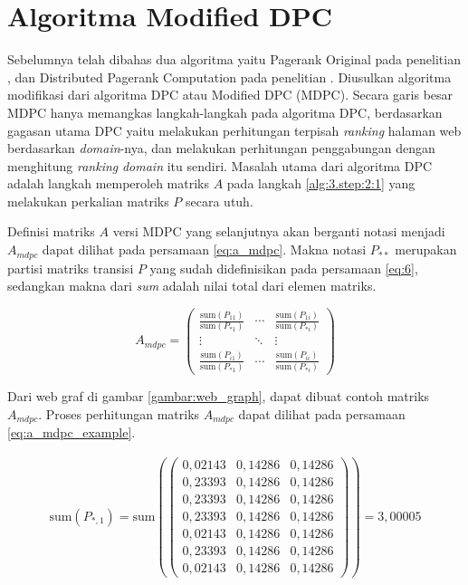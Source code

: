 \section{Algoritma Modified DPC}

Sebelumnya telah dibahas dua algoritma yaitu Pagerank Original pada penelitian \citet{ilprints422}, dan Distributed Pagerank Computation pada penelitian \citet{zhuetal2005distributedPagerank}. Diusulkan algoritma modifikasi dari algoritma DPC atau Modified DPC (MDPC). Secara garis besar MDPC hanya memangkas langkah-langkah pada algoritma DPC, berdasarkan gagasan utama DPC yaitu melakukan perhitungan terpisah \textit{ranking} halaman web berdasarkan \textit{domain}-nya, dan melakukan perhitungan penggabungan dengan menghitung \textit{ranking} \textit{domain} itu sendiri. Masalah utama dari algoritma DPC adalah langkah memperoleh matriks $A$ pada langkah \ref{alg:3.step:2:1} yang melakukan perkalian matriks $P$ secara utuh.

Definisi matriks $A$ versi MDPC yang selanjutnya akan berganti notasi menjadi $A_{mdpc}$ dapat dilihat pada persamaan \ref{eq:a_mdpc}. Makna notasi $P_{**}$ merupakan partisi matriks transisi $P$ yang sudah didefinisikan pada persamaan \ref{eq:6}, sedangkan makna dari \textit{sum} adalah nilai total dari elemen matriks.

\begin{equation}
	\label{eq:a_mdpc}
	A_{mdpc} =
	\begin{pmatrix}
		\frac{\text{sum}(P_{11})}{\text{sum}(P_{*1})} & \cdots & \frac{\text{sum}(P_{1i})}{\text{sum}(P_{*i})} \\
		\vdots & \ddots & \vdots \\
		\frac{\text{sum}(P_{i1})}{\text{sum}(P_{*1})} & \cdots & \frac{\text{sum}(P_{ii})}{\text{sum}(P_{*i})}
	\end{pmatrix}
\end{equation}

Dari web graf di gambar \ref{gambar:web_graph}, dapat dibuat contoh matriks $A_{mdpc}$. Proses perhitungan matriks $A_{mdpc}$ dapat dilihat pada persamaan \ref{eq:a_mdpc_example}.

\begingroup
\makeatletter
\def\f@size{8}
\check@mathfonts
\begin{align*}
	\text{sum}(P_{\ast,1}) = \text{sum}(
		\begin{pmatrix}
			0,02143 & 0,14286 & 0,14286 \\
			0,23393 & 0,14286 & 0,14286 \\
			0,23393 & 0,14286 & 0,14286 \\
			0,23393 & 0,14286 & 0,14286 \\
			0,02143 & 0,14286 & 0,14286 \\
			0,23393 & 0,14286 & 0,14286 \\
			0,02143 & 0,14286 & 0,14286
		\end{pmatrix}
	) = 3,00005 \\
\end{align*}

